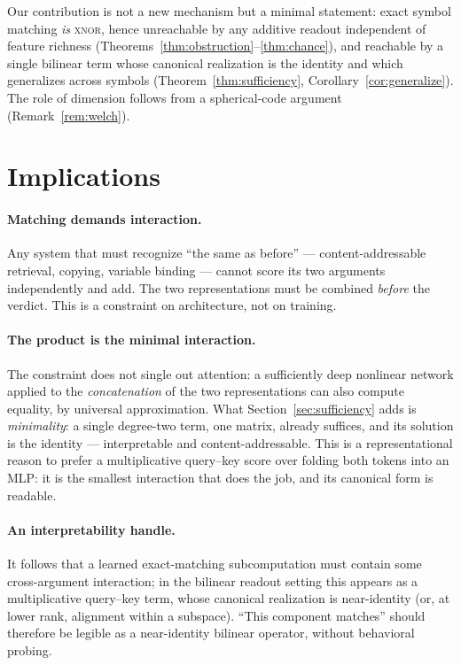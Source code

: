 \documentclass[11pt]{article}
\theoremstyle{plain}
\theoremstyle{definition}
\theoremstyle{remark}
\begin{document}
Our contribution is not a new mechanism but a minimal statement: exact symbol matching \emph{is} \textsc{xnor}, hence unreachable by any additive readout independent of feature richness (Theorems~\ref{thm:obstruction}--\ref{thm:chance}), and reachable by a single bilinear term whose canonical realization is the identity and which generalizes across symbols (Theorem~\ref{thm:sufficiency}, Corollary~\ref{cor:generalize}). The role of dimension follows from a spherical-code argument (Remark~\ref{rem:welch}).

\section{Implications}
\label{sec:implications}

\paragraph{Matching demands interaction.} Any system that must recognize ``the same as before'' --- content-addressable retrieval, copying, variable binding --- cannot score its two arguments independently and add. The two representations must be combined \emph{before} the verdict. This is a constraint on architecture, not on training.

\paragraph{The product is the minimal interaction.} The constraint does not single out attention: a sufficiently deep nonlinear network applied to the \emph{concatenation} of the two representations can also compute equality, by universal approximation. What Section~\ref{sec:sufficiency} adds is \emph{minimality}: a single degree-two term, one matrix, already suffices, and its solution is the identity --- interpretable and content-addressable. This is a representational reason to prefer a multiplicative query--key score over folding both tokens into an MLP: it is the smallest interaction that does the job, and its canonical form is readable.

\paragraph{An interpretability handle.} It follows that a learned exact-matching subcomputation must contain some cross-argument interaction; in the bilinear readout setting this appears as a multiplicative query--key term, whose canonical realization is near-identity (or, at lower rank, alignment within a subspace). ``This component matches'' should therefore be legible as a near-identity bilinear operator, without behavioral probing.
\end{document}
